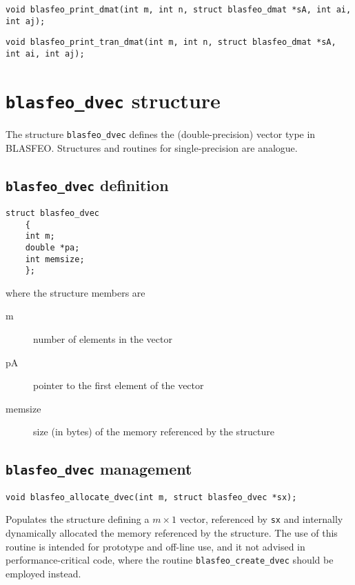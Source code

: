 \documentclass[a4paper]{report}
\begin{document}
\begin{verbatim}
void blasfeo_print_dmat(int m, int n, struct blasfeo_dmat *sA, int ai, int aj);
\end{verbatim}

\begin{verbatim}
void blasfeo_print_tran_dmat(int m, int n, struct blasfeo_dmat *sA, int ai, int aj);
\end{verbatim}



\section{{\tt blasfeo\_dvec} structure}

The structure {\tt blasfeo\_dvec} defines the (double-precision) vector type in BLASFEO.
Structures and routines for single-precision are analogue.



\subsection{{\tt blasfeo\_dvec} definition}

\begin{verbatim}
struct blasfeo_dvec 
    {
    int m;
    double *pa;
    int memsize;
    };
\end{verbatim}
where the structure members are
\begin{description}
\item[m] number of elements in the vector
\item[pA] pointer to the first element of the vector
\item[memsize] size (in bytes) of the memory referenced by the structure
\end{description}



\subsection{{\tt blasfeo\_dvec} management}

\begin{verbatim}
void blasfeo_allocate_dvec(int m, struct blasfeo_dvec *sx);
\end{verbatim}
Populates the structure defining a $m\times 1$ vector, referenced by {\tt sx} and internally dynamically allocated the memory referenced by the structure.
The use of this routine is intended for prototype and off-line use, and it not advised in performance-critical code, where the routine {\tt blasfeo\_create\_dvec} should be employed instead.
\end{document}
